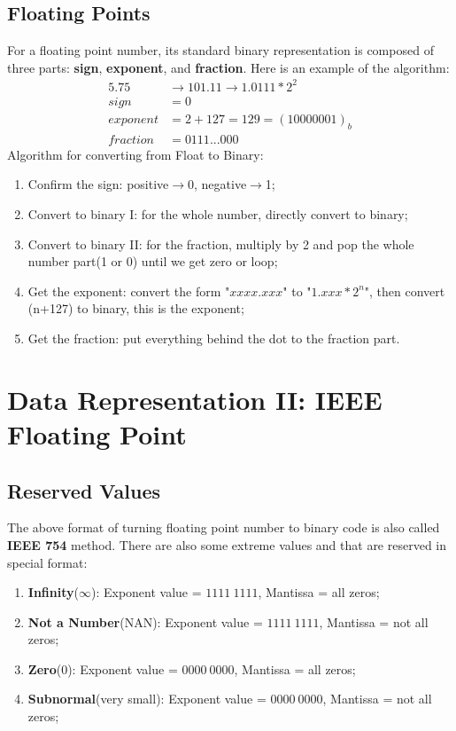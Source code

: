 \documentclass{article}
\begin{document}
\subsection{Floating Points}
For a floating point number, its standard binary representation is composed of three parts: \textbf{sign}, \textbf{exponent}, and \textbf{fraction}. Here is an example of the algorithm:
\begin{align*}
    5.75 &\rightarrow 101.11 \rightarrow 1.0111*2^2\\
    sign &= 0\\
    exponent &= 2+127 = 129 = (10000001)_b\\
    fraction &= 0111...000
\end{align*}
Algorithm for converting from Float to Binary:
\begin{enumerate}
    \item Confirm the sign: positive$\rightarrow$0, negative$\rightarrow$1;
    \item Convert to binary I: for the whole number, directly convert to binary;
    \item Convert to binary II: for the fraction, multiply by 2 and pop the whole number part(1 or 0) until we get zero or loop;
    \item Get the exponent: convert the form "$xxxx.xxx$" to "$1.xxx*2^n$", then convert (n+127) to binary, this is the exponent;
    \item Get the fraction: put everything behind the dot to the fraction part.
\end{enumerate}
\newpage


\section{Data Representation II: IEEE Floating Point}
\subsection{Reserved Values}
The above format of turning floating point number to binary code is also called \textbf{IEEE 754} method. There are also some extreme values and that are reserved in special format:
\begin{enumerate}
    \item \textbf{Infinity}($\infty$): Exponent value = $1111~1111$, Mantissa = all zeros;
    \item \textbf{Not a Number}(NAN): Exponent value =  $1111~1111$, Mantissa = not all zeros;
    \item \textbf{Zero}(0): Exponent value = $0000~0000$, Mantissa = all zeros;
    \item \textbf{Subnormal}(very small): Exponent value =  $0000~0000$, Mantissa = not all zeros;
\end{enumerate}
\end{document}

